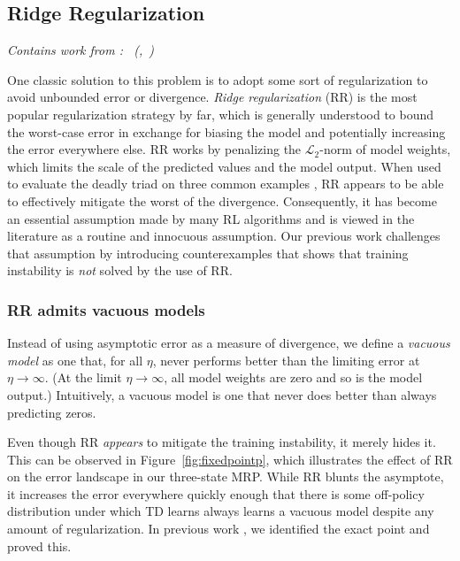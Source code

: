 \documentclass[11pt]{article}
\begin{document}
\newcommand{\subsectionsubtitle}[1]{\emph{#1}}

\subsection{Ridge Regularization}
\subsectionsubtitle{Contains work from \cite{manek2022pitfalls}: \citetitle{manek2022pitfalls}~(\citeauthor{manek2022pitfalls},~\citeyear{manek2022pitfalls})}

One classic solution to this problem is to adopt some sort of regularization to avoid unbounded error or divergence. \emph{Ridge regularization} (RR) \cite{tikhonov1943stability} is the most popular regularization strategy by far, which is generally understood to bound the worst-case error in exchange for biasing the model and potentially increasing the error everywhere else. RR works by penalizing the $\mathcal L_2$-norm of model weights, which limits the scale of the predicted values and the model output. When used to evaluate the deadly triad on three common examples \cite[pg.260]{kolter2011fixed,baird1993counterexample,sutton2020reinforcement}, RR appears to be able to effectively mitigate the worst of the divergence. Consequently, it has become an essential assumption made by many RL algorithms \cite{diddigi2019convergent,mahadevan2014proximal,sutton2009fast,yu2017convergence,zhang2020provably,zhang2021breaking} and is viewed in the literature as a routine and innocuous assumption. Our previous work \citep{manek2022pitfalls} challenges that assumption by introducing counterexamples that shows that training instability is \emph{not} solved by the use of RR.

\subsubsection{RR admits vacuous models}
Instead of using asymptotic error as a measure of divergence, we define a \emph{vacuous model} as one that, for all $\eta$, never performs better than the limiting error at $\eta\to\infty$. (At the limit $\eta\to\infty$, all model weights are zero and so is the model output.) Intuitively, a vacuous model is one that never does better than always predicting zeros.

Even though RR \emph{appears} to mitigate the training instability, it merely hides it. This can be observed in Figure~\ref{fig:fixedpointp}, which illustrates the effect of RR on the error landscape in our three-state MRP. While RR blunts the asymptote, it increases the error everywhere quickly enough that there is some off-policy distribution under which TD learns always learns a vacuous model despite any amount of regularization. In previous work \citep{manek2022pitfalls}, we identified the exact point and proved this.
\end{document}
